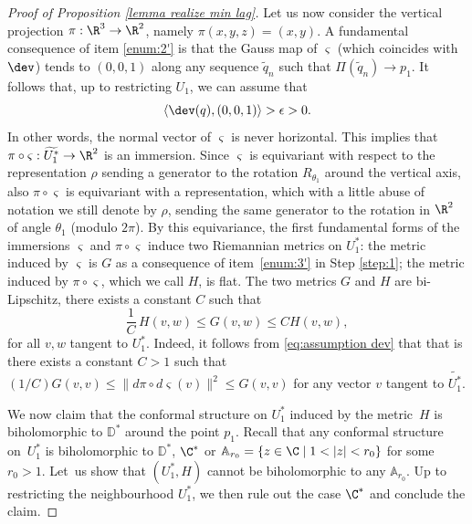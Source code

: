 \begin{proof}[Proof of Proposition \ref{lemma realize min lag}]
\step\label{step:4}
Let us now consider the vertical projection $\pi:\R^3\to\R^2$, namely $\pi(x,y,z)=(x,y)$.
A fundamental consequence of item \eqref{enum:2'} is that the Gauss map of $\varsigma$ (which coincides with $\dev$) tends to $(0,0,1)$ along any sequence $\widetilde q_n$ such that $\Pi(\widetilde q_n)\to p_1$. It follows that, up to restricting $U_1$, we can assume that
\begin{equation}\label{eq:assumption dev}
\langle\dev(q),(0,0,1)\rangle>\epsilon> 0.
\end{equation}
In other words, the normal vector of $\varsigma$ is never horizontal.
This implies that $\pi\circ\varsigma:\widetilde{U_1^*}\to\nobreak\R^2$ is an immersion. Since $\varsigma$ is equivariant with respect to the representation $\rho$ sending a generator to the rotation $R_{\theta_1}$ around the vertical axis, also $\pi\circ\varsigma$ is equivariant with a representation, which with a little abuse of notation we still denote by $\rho$, sending the same generator to the rotation in $\R^2$ of angle $\theta_1$ (modulo $2\pi$). By this equivariance, the first fundamental forms of the immersions $\varsigma$ and $\pi\circ\varsigma$ induce two Riemannian metrics on $U_1^*$: the metric induced by $\varsigma$ is $G$ as a consequence of item~\eqref{enum:3'} in Step \ref{step:1}; the metric induced by $\pi\circ\varsigma$, which we call $H$, is flat. The two metrics $G$ and $H$ are bi-Lipschitz, \ie there exists a constant $C$ such that
\begin{equation}\label{eq:assumption bilip}
\frac{1}{C}\,H(v,w)\leq G(v,w)\leq CH(v,w),
\end{equation}
for all $v,w$ tangent to $U_1^*$. Indeed, it follows from \eqref{eq:assumption dev} that that is there exists a constant $C>1$ such that
$({1}/{C}){G(v,v)}\leq \|d\pi\circ d\varsigma(v)\|^2\leq {G(v,v)}$
for any vector $v$ tangent to $\widetilde{U_1^*}$.

\step\label{step:5}
We now claim that the conformal structure on $U_1^*$ induced by the metric~$H$ is biholomorphic to $\mathbb D^*$ around the point $p_1$. Recall that any conformal structure on~$U_1^*$ is biholomorphic to $\mathbb D^*$, $\C^*$ or $\mathbb A_{r_0}=\{z\in\C\mid1<|z|<r_0\}$ for some $r_0>1$. Let~us show that $(U_1^*,H)$ cannot be biholomorphic to any $\mathbb A_{r_0}$. Up to restricting the neighbourhood $U_1^*$, we then rule out the case $\C^*$ and conclude the claim.


\end{proof}
